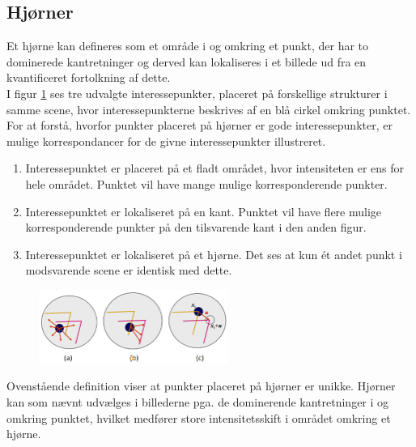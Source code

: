 \subsection{Hjørner}\label{subsec:corner}
Et hjørne kan defineres som et område i og omkring et punkt, der har to dominerede kantretninger og derved kan lokaliseres i et billede ud fra en kvantificeret fortolkning af dette. \\ 
I figur \ref{app} ses tre udvalgte interessepunkter, placeret på forskellige strukturer i samme scene, hvor interessepunkterne beskrives af en blå cirkel omkring punktet. For at forstå, hvorfor punkter placeret på hjørner er gode interessepunkter, er mulige korrespondancer for de givne interessepunkter illustreret.
\begin{enumerate}[label=\alph*]
\item{Interessepunktet er placeret på et fladt området, hvor intensiteten er ens for hele området. Punktet vil have mange mulige korresponderende punkter.}
\item{Interessepunktet er lokaliseret på en kant. Punktet vil have flere mulige korresponderende punkter på den tilsvarende kant i den anden figur.}
\item{Interessepunktet er lokaliseret på et hjørne. Det ses at kun ét andet punkt i modsvarende scene er identisk med dette.}
\end{enumerate}
\begin{figure}[H]
    \centering
    \includegraphics[width=0.55\textwidth]{fig/37.png}
    \vspace{-1em}   
    \begin{center}    
    \caption{\textcolor{gray}{\footnotesize \textit{
 }}}
    \label{app}
     \end{center}
    \vspace{-2.7em}  
  \end{figure}  
\noindent
Ovenstående definition viser at punkter placeret på hjørner er unikke. Hjørner kan som nævnt udvælges i billederne pga. de dominerende kantretninger i og omkring punktet, hvilket medfører store intensitetsskift i området omkring et hjørne.